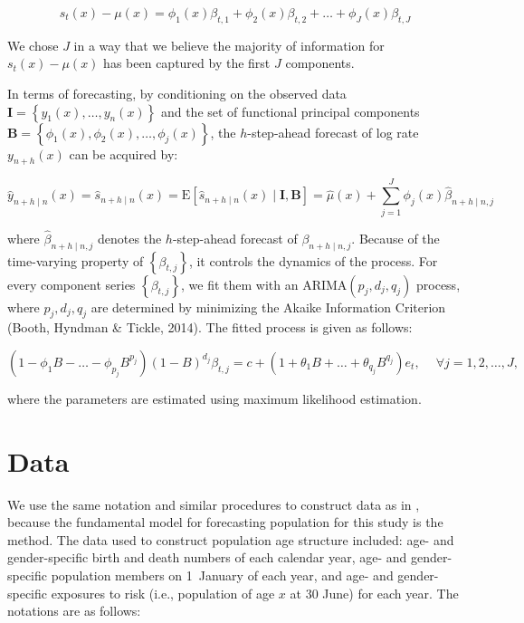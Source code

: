 \documentclass[11pt,a4paper,]{article}
\begin{document}
\begin{equation*}
  s_t(x)-\mu(x) = \phi_1(x)\beta_{t,1}+\phi_2(x)\beta_{t,2}+\dots+\phi_J(x)\beta_{t,J}
\end{equation*}

We chose \(J\) in a way that we believe the majority of information for
\(s_t(x)-\mu(x)\) has been captured by the first \(J\) components.

In terms of forecasting, by conditioning on the observed data
\(\bm{I}=\left\{{y_1(x),\dots,y_n(x)}\right\}\) and the set of
functional principal components
\(\bm{B}=\left\{{\phi_1(x),\phi_2(x),\dots,\phi_j(x)}\right\}\), the
\(h\)-step-ahead forecast of log rate \(y_{n+h}(x)\) can be acquired by:
\vspace{-.2in}

\begin{equation}
  \widehat{y}_{n+h\mid n}(x)=\widehat{s}_{n+h\mid n}(x) = \text{E}[\widehat{s}_{n+h\mid n}(x)\mid \bm{I, B}] = \widehat{\mu}(x)+\sum_{j=1}^{J}\phi_j(x)\widehat{\beta}_{n+h\mid n,j}
\end{equation}

where \(\widehat{\beta}_{n+h\mid n,j}\) denotes the \(h\)-step-ahead
forecast of \(\beta_{n+h\mid n,j}\). Because of the time-varying
property of \(\left\{\beta_{t,j}\right\}\), it controls the dynamics of
the process. For every component series \(\left\{\beta_{t,j}\right\}\),
we fit them with an ARIMA\((p_j,d_j,q_j)\) process, where
\(p_j,d_j,q_j\) are determined by minimizing the Akaike Information
Criterion (Booth, Hyndman \& Tickle, 2014). The fitted process is given
as follows: \vspace{-.3in}

\begin{equation*}
  (1-\phi_1B-\dots-\phi_{p_j}B^{p_j})(1-B)^{d_j}\beta_{t,j}=c+(1+\theta_1B+\dots+\theta_{q_j}B^{q_j})e_t, \quad ~\forall j=1,2,\dots,J,
\end{equation*}

where the parameters are estimated using maximum likelihood estimation.

\section{Data}\label{sec:data}

We use the same notation and similar procedures to construct data as in
\textcite{HB08}, because the fundamental model for forecasting
population for this study is the \textcite{HU07} method. The data used
to construct population age structure included: age- and gender-specific
birth and death numbers of each calendar year, age- and gender-specific
population members on 1~January of each year, and age- and
gender-specific exposures to risk (i.e., population of age \(x\) at 30
June) for each year. The notations are as follows: \vspace{-.4in}
\end{document}

